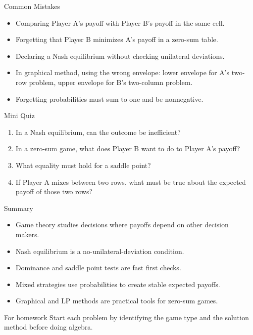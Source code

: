 \documentclass[10pt,aspectratio=169]{beamer}
\begin{document}
\begin{frame}{Common Mistakes}
\begin{itemize}
  \item Comparing Player A's payoff with Player B's payoff in the same cell.
  \item Forgetting that Player B minimizes A's payoff in a zero-sum table.
  \item Declaring a Nash equilibrium without checking unilateral deviations.
  \item In graphical method, using the wrong envelope: lower envelope for A's two-row problem, upper envelope for B's two-column problem.
  \item Forgetting probabilities must sum to one and be nonnegative.
\end{itemize}
\end{frame}

\begin{frame}{Mini Quiz}
\begin{enumerate}
  \item In a Nash equilibrium, can the outcome be inefficient?
  \item In a zero-sum game, what does Player B want to do to Player A's payoff?
  \item What equality must hold for a saddle point?
  \item If Player A mixes between two rows, what must be true about the expected payoff of those two rows?
\end{enumerate}
\end{frame}

\begin{frame}{Summary}
\begin{itemize}
  \item Game theory studies decisions where payoffs depend on other decision makers.
  \item Nash equilibrium is a no-unilateral-deviation condition.
  \item Dominance and saddle point tests are fast first checks.
  \item Mixed strategies use probabilities to create stable expected payoffs.
  \item Graphical and LP methods are practical tools for zero-sum games.
\end{itemize}
\vspace{0.3cm}
\begin{block}{For homework}
Start each problem by identifying the game type and the solution method before doing algebra.
\end{block}
\end{frame}
\end{document}
